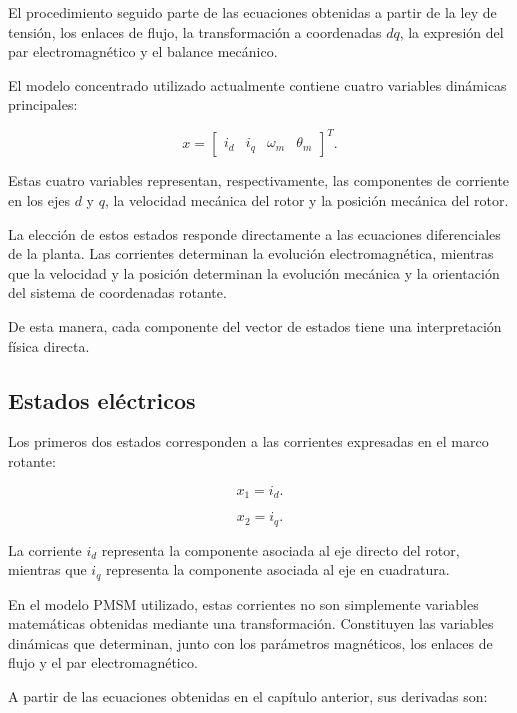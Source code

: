 El procedimiento seguido parte de las ecuaciones obtenidas a partir de la ley de tensión, los enlaces de flujo, la transformación a coordenadas $dq$, la expresión del par electromagnético y el balance mecánico.

El modelo concentrado utilizado actualmente contiene cuatro variables dinámicas principales:

\begin{equation}
x =
\begin{bmatrix}
i_d &
i_q &
\omega_m &
\theta_m
\end{bmatrix}^{T}.
\end{equation}

Estas cuatro variables representan, respectivamente, las componentes de corriente en los ejes $d$ y $q$, la velocidad mecánica del rotor y la posición mecánica del rotor.

La elección de estos estados responde directamente a las ecuaciones diferenciales de la planta. Las corrientes determinan la evolución electromagnética, mientras que la velocidad y la posición determinan la evolución mecánica y la orientación del sistema de coordenadas rotante.

De esta manera, cada componente del vector de estados tiene una interpretación física directa.

\subsection{Estados eléctricos}

Los primeros dos estados corresponden a las corrientes expresadas en el marco rotante:

\begin{equation}
x_1=i_d.
\end{equation}

\begin{equation}
x_2=i_q.
\end{equation}

La corriente $i_d$ representa la componente asociada al eje directo del rotor, mientras que $i_q$ representa la componente asociada al eje en cuadratura.

En el modelo PMSM utilizado, estas corrientes no son simplemente variables matemáticas obtenidas mediante una transformación. Constituyen las variables dinámicas que determinan, junto con los parámetros magnéticos, los enlaces de flujo y el par electromagnético.

A partir de las ecuaciones obtenidas en el capítulo anterior, sus derivadas son:

